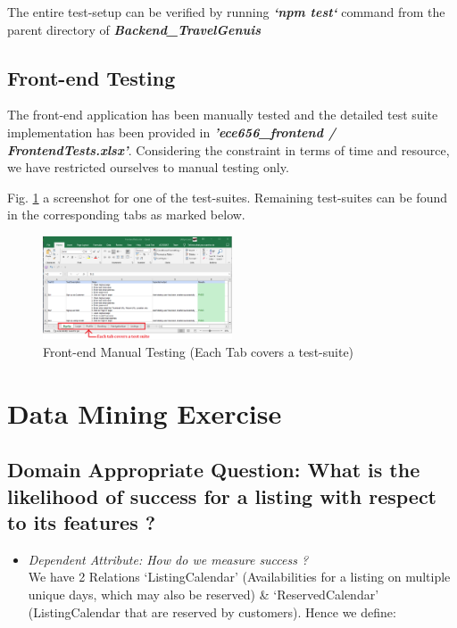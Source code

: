 \documentclass[conference]{IEEEtran}
\begin{document}
{        The entire test-setup can be verified by running \textit{\textbf{`npm test`}} command from the parent directory of \textit{\textbf{Backend\_TravelGenuis}}

	



    \subsection{\textbf{Front-end Testing}}
        {The front-end application has been manually tested and the detailed test suite implementation has been provided in \textbf{\textit{'ece656\_frontend / FrontendTests.xlsx’}}. Considering the constraint in terms of time and resource, we have restricted ourselves to manual testing only.}

        Fig. {\ref{FrontendTests}} a screenshot for one of the test-suites. Remaining test-suites can be found in the corresponding tabs as marked below.
        \begin{figure}[!h]
            \centering
            \includegraphics[width=0.5\textwidth]{../Directly_As_Images/FrontendTests.png}
            \caption{Front-end Manual Testing (Each Tab covers a test-suite)} \label{FrontendTests}
        \end{figure}


\section{\textbf{Data Mining Exercise}}
    \subsection{\textbf{Domain Appropriate Question:  What is the likelihood of success for a listing with respect to its features ?}}
	 \begin{itemize}
           	 \item \textit{Dependent Attribute: How do we measure success ?}\\
			We have 2 Relations ‘ListingCalendar’ (Availabilities for a listing on multiple unique days, which may also be reserved)  \&  ‘ReservedCalendar’ (ListingCalendar that are reserved by customers). Hence we define: \\


\end{itemize}}
\end{document}
